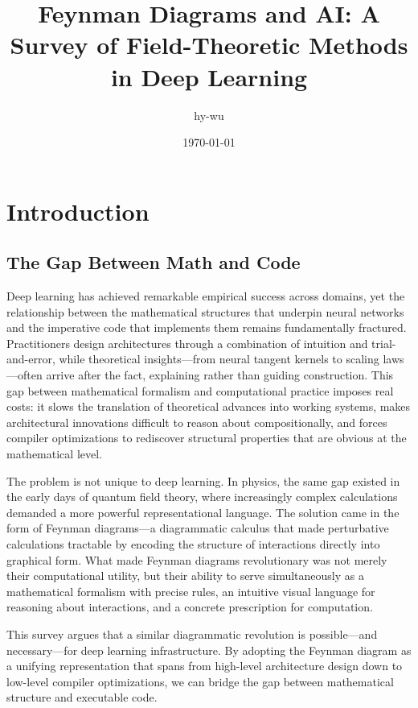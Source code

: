 \documentclass[12pt,a4paper]{article}
\title{Feynman Diagrams and AI: A Survey of Field-Theoretic Methods in Deep Learning}
\author{hy-wu}
\date{\today}
\begin{document}
\maketitle

\section{Introduction}
\subsection{The Gap Between Math and Code}

Deep learning has achieved remarkable empirical success across domains, yet the relationship between the mathematical structures that underpin neural networks and the imperative code that implements them remains fundamentally fractured. Practitioners design architectures through a combination of intuition and trial-and-error, while theoretical insights---from neural tangent kernels to scaling laws---often arrive after the fact, explaining rather than guiding construction. This gap between mathematical formalism and computational practice imposes real costs: it slows the translation of theoretical advances into working systems, makes architectural innovations difficult to reason about compositionally, and forces compiler optimizations to rediscover structural properties that are obvious at the mathematical level.

The problem is not unique to deep learning. In physics, the same gap existed in the early days of quantum field theory, where increasingly complex calculations demanded a more powerful representational language. The solution came in the form of Feynman diagrams---a diagrammatic calculus that made perturbative calculations tractable by encoding the structure of interactions directly into graphical form. What made Feynman diagrams revolutionary was not merely their computational utility, but their ability to serve simultaneously as a mathematical formalism with precise rules, an intuitive visual language for reasoning about interactions, and a concrete prescription for computation.\cite{feynman2020feynman}

This survey argues that a similar diagrammatic revolution is possible---and necessary---for deep learning infrastructure. By adopting the Feynman diagram as a unifying representation that spans from high-level architecture design down to low-level compiler optimizations, we can bridge the gap between mathematical structure and executable code.
\end{document}
